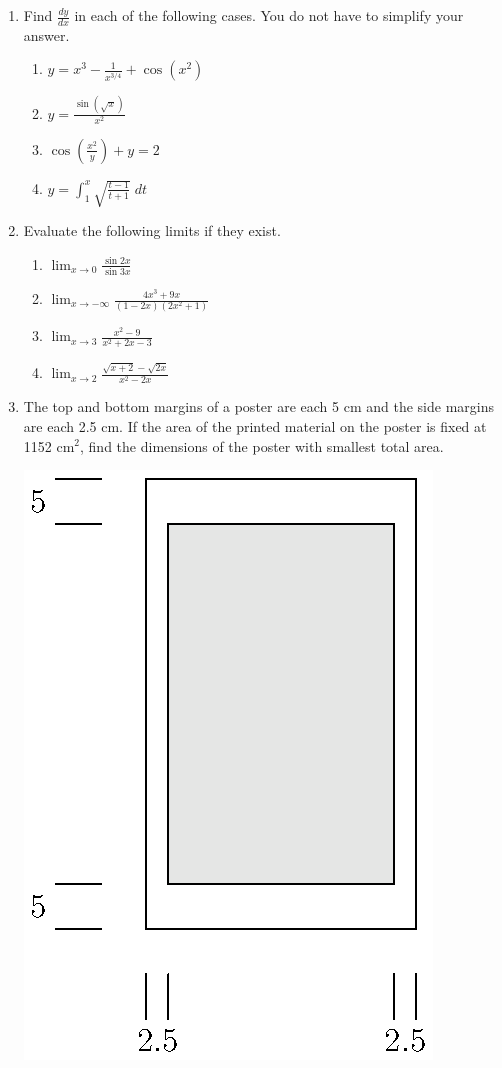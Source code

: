 \documentclass[12pt]{article}
\newcommand{\ds}{\displaystyle}
\begin{document}
\begin{enumerate}
\item Find
  $\ds \frac{dy}{dx}$ in each of the following cases.
  You do not have to simplify your answer.
  \begin{enumerate}
  \item $\ds y = x^3 - \frac{1}{x^{3/4}} + \cos(x^2)$
\vfill
  \item $\ds y = \frac{\sin(\sqrt{x})}{x^2}$
\vfill
  \item $\ds\cos\left(\frac{x^2}{y}\right)+y=2$
\vfill
  \item $\ds y=\int_1^{x} \sqrt{\frac{t-1}{t+1}} \; dt$
\vfill
  \end{enumerate}
\newpage
\item Evaluate
  the following limits if they exist.
  \begin{enumerate}
  \item $\ds \lim_{x\to 0} 
    \frac{\sin 2x}{\sin 3x}$
\vfill
  \item $\ds \lim_{x\to -\infty} \frac{4x^3+9x}{(1-2x)(2x^2+1)}$
\vfill
  \item $\ds \lim_{x\to 3} \frac{x^2-9}{x^2+2x-3}$
\vfill
  \item $\ds \lim_{x\to 2} \frac{\sqrt{x+2}- \sqrt{2x}}{x^2-2x}$
\vfill
  \end{enumerate}
\newpage
\item The top and bottom 
  margins of a poster are 
  each 5 cm and the side margins are each 2.5 cm.  If the area of 
  the printed material on the poster is fixed at 1152 cm$^2$,
  find the dimensions of the poster with smallest total area.  
  \begin{floatingfigure}{2in}
    \includegraphics{poster.eps}

\end{floatingfigure}
\end{enumerate}
\end{document}
